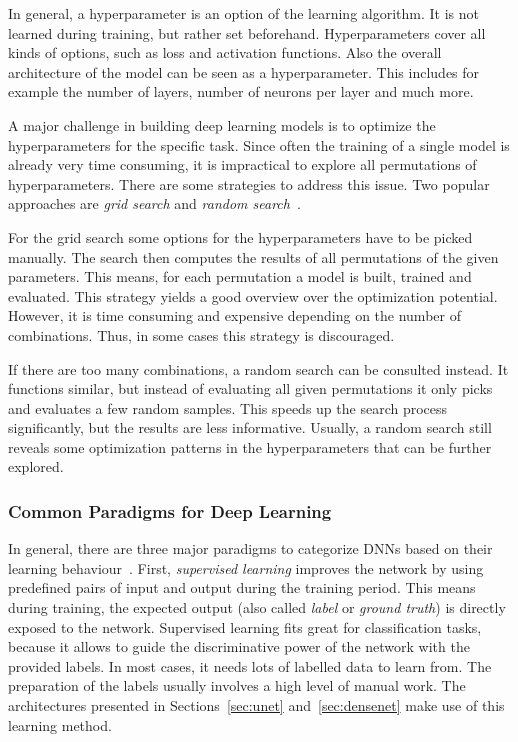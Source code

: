 In general, a hyperparameter is an option of the learning algorithm. It is not learned during training, but rather set beforehand. Hyperparameters cover all kinds of options, such as loss and activation functions. Also the overall architecture of the model can be seen as a hyperparameter. This includes for example the number of layers, number of neurons per layer and much more.

A major challenge in building deep learning models is to optimize the hyperparameters for the specific task. Since often the training of a single model is already very time consuming, it is impractical to explore all permutations of hyperparameters. There are some strategies to address this issue. Two popular approaches are \emph{grid search} and \emph{random search}~\cite[pp.~73ff]{praxiseinstieg_ml17}.

For the grid search some options for the hyperparameters have to be  picked manually. The search then computes the results of all permutations of the given parameters. This means, for each permutation a model is built, trained and evaluated. This strategy yields a good overview over the optimization potential. However, it is time consuming and expensive depending on the number of combinations. Thus, in some cases this strategy is discouraged.

If there are too many combinations, a random search can be consulted instead. It functions similar, but instead of evaluating all given permutations it only picks and evaluates a few random samples. This speeds up the search process significantly, but the results are less informative. Usually, a random search still reveals some optimization patterns in the hyperparameters that can be further explored.

\subsubsection{Common Paradigms for Deep Learning}
\label{sec:dl_paradigms}
In general, there are three major paradigms to categorize DNNs based on their learning behaviour~\cite[p.~214f]{dlma14}. First, \emph{supervised learning} improves the network by using predefined pairs of input and output during the training period. This means during training, the expected output (also called \emph{label} or \emph{ground truth}) is directly exposed to the network. Supervised learning fits great for classification tasks, because it allows to guide the discriminative power of the network with the provided labels. In most cases, it needs lots of labelled data to learn from. The preparation of the labels usually involves a high level of manual work. The architectures presented in Sections~\ref{sec:unet} and~\ref{sec:densenet} make use of this learning method.

